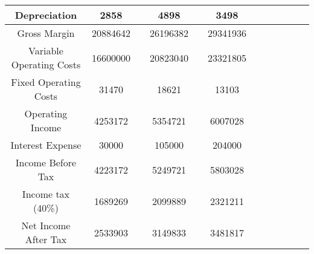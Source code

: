 {\begin{longtable}[c]{|c|c|c|c|c|c|c|c|c|c|c|c|}
\hline
Depreciation                                                                                                                    & 2858                              &  & 4898         &  & 3498      &  &           &  &           &  &           \\
\hline
Gross Margin                                                                                                                    & 20884642                          &  & 26196382     &  & 29341936  &  &           &  &           &  &           \\
\hline
Variable Operating Costs                                                                                                        & 16600000                          &  & 20823040     &  & 23321805  &  &           &  &           &  &           \\
\hline
Fixed Operating Costs                                                                                                           & 31470                             &  & 18621        &  & 13103     &  &           &  &           &  &           \\
\hline
Operating Income                                                                                                                & 4253172                           &  & 5354721      &  & 6007028   &  &           &  &           &  &           \\
\hline
Interest Expense                                                                                                                & 30000                             &  & 105000       &  & 204000    &  &           &  &           &  &           \\
\hline
Income Before Tax                                                                                                               & 4223172                           &  & 5249721      &  & 5803028   &  &           &  &           &  &           \\
\hline
Income tax (40\%)                                                                                                                & 1689269                           &  & 2099889      &  & 2321211   &  &           &  &           &  &           \\
\hline
Net Income After Tax                                                                                                            & 2533903                           &  & 3149833      &  & 3481817   &  &           &  &           &  &           \\

\end{longtable}}
